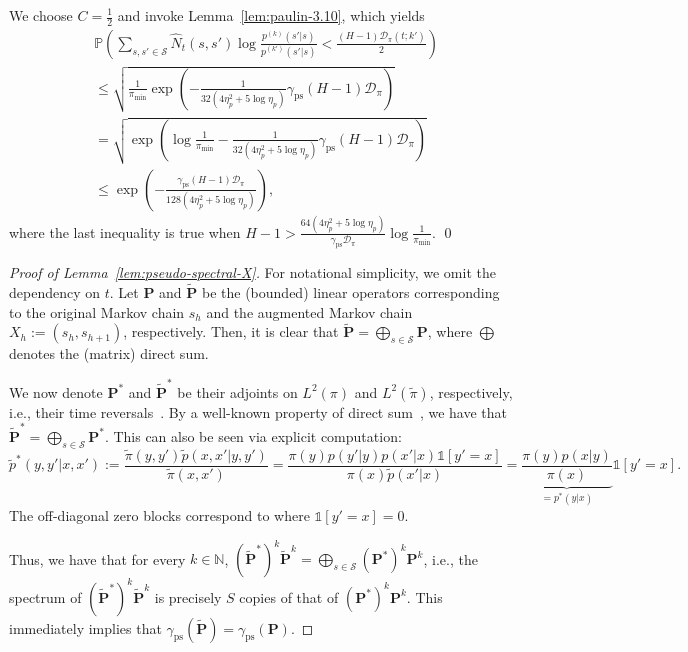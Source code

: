 \documentclass[twoside]{article}
\def\mP{{\bm{P}}}
\def\gD{{\mathcal{D}}}
\def\gS{{\mathcal{S}}}
\def\sN{{\mathbb{N}}}
\def\sP{{\mathbb{P}}}
\theoremstyle{plain}
\newcommand{\indicator}{\mathds{1}}
\newcommand{\ps}{\mathrm{ps}}
\begin{document}
We choose $C = \frac{1}{2}$ and invoke Lemma~\ref{lem:paulin-3.10}, which yields
\begin{align*}
    &\sP\left( \sum_{s, s' \in \gS} \widehat{N}_t(s, s') \log \frac{p^{(k)}(s' | s)}{p^{(k')}(s' | s)} < \frac{(H - 1) \gD_\pi(t; k')}{2} \right) \\ &\leq \sqrt{\frac{1}{\pi_{\min}} \exp\left( - \frac{1}{32(4\eta_p^2 + 5 \log\eta_p)} \gamma_\ps (H - 1) \gD_\pi \right)} \\
    &= \sqrt{\exp\left( \log\frac{1}{\pi_{\min}} - \frac{1}{32(4\eta_p^2 + 5 \log\eta_p)} \gamma_\ps (H - 1) \gD_\pi \right)} \\
    &\leq \exp\left( - \frac{\gamma_\ps (H - 1) \gD_\pi}{128(4\eta_p^2 + 5 \log\eta_p)} \right),
\end{align*}
where the last inequality is true when {\color{blue}$H - 1 > \frac{64 (4\eta_p^2 + 5 \log\eta_p)}{\gamma_\ps \gD_\pi} \log\frac{1}{\pi_{\min}}$}.
\qed


\begin{proof}[Proof of Lemma~\ref{lem:pseudo-spectral-X}]
    For notational simplicity, we omit the dependency on $t$.
    Let $\mP$ and $\widetilde{\mP}$ be the (bounded) linear operators corresponding to the original Markov chain $s_h$ and the augmented Markov chain $X_h := (s_h, s_{h+1})$, respectively.
    Then, it is clear that $\widetilde{\mP} = \bigoplus_{s \in \gS} \mP$, where $\bigoplus$ denotes the (matrix) direct sum.

    We now denote $\mP^*$ and $\widetilde{\mP}^*$ be their adjoints on $L^2(\pi)$ and $L^2(\tilde{\pi})$, respectively, i.e., their time reversals~\citep{lezaud1998chernoff}.
    By a well-known property of direct sum~\citep{hornjohnson}, we have that $\widetilde{\mP}^* = \bigoplus_{s \in \gS} \mP^*$.
    This can also be seen via explicit computation:
    \begin{equation*}
        \tilde{p}^*(y, y' | x, x')
        := \frac{\tilde{\pi}(y, y') \tilde{p}(x, x' | y, y')}{\tilde{\pi}(x, x')}
        = \frac{\pi(y) p(y' | y) p(x' | x) \indicator[y' = x]}{\pi(x) \tilde{p}(x' | x)}
        = \underbrace{\frac{\pi(y) p(x | y)}{\pi(x)}}_{= p^*(y | x)} \indicator[y' = x].
    \end{equation*}
    The off-diagonal zero blocks correspond to where $\indicator[y' = x] = 0$.

    Thus, we have that for every $k \in \sN$, $(\widetilde{\mP}^*)^k \widetilde{\mP}^k = \bigoplus_{s \in \gS} (\mP^*)^k \mP^k$, i.e., the spectrum of $(\widetilde{\mP}^*)^k \widetilde{\mP}^k$ is precisely $S$ copies of that of $(\mP^*)^k \mP^k$.
    This immediately implies that $\gamma_\ps(\widetilde{\mP}) = \gamma_\ps(\mP)$.
\end{proof}
\end{document}
